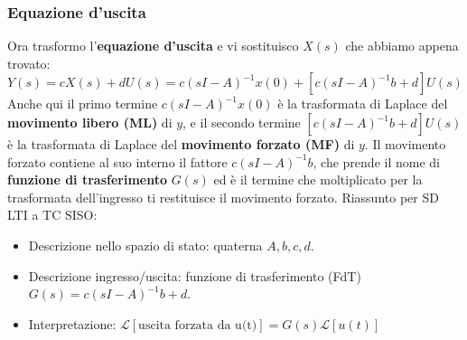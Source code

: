 \subsubsection{Equazione d'uscita}
Ora trasformo l'\textbf{equazione d'uscita} e vi sostituisco $X(s)$ che abbiamo appena trovato:
\[
    Y(s) = cX(s) + dU(s) = c(sI-A)^{-1} x(0) + [c(sI-A)^{-1} b + d]U(s)
\]
Anche qui il primo termine $c(sI-A)^{-1} x(0)$ è la trasformata di Laplace del \textbf{movimento libero (ML)} di $y$, e il secondo termine $[c(sI-A)^{-1} b + d]U(s)$ è la trasformata di Laplace del \textbf{movimento forzato (MF)} di $y$.\newline
Il movimento forzato contiene al suo interno il fattore $c(sI-A)^{-1} b$, che prende il nome di \textbf{funzione di trasferimento} $G(s)$ ed è il termine che moltiplicato per la trasformata dell'ingresso ti restituisce il movimento forzato.\newline
\newline
\newline
Riassunto per SD LTI a TC SISO:
\begin{itemize}
    \item Descrizione nello spazio di stato: quaterna $A, b, c, d$.
    \item Descrizione ingresso/uscita: funzione di trasferimento (FdT) $G(s) = c(sI-A)^{-1}b +d$.
    \item Interpretazione: $\mathcal{L}[\text{uscita forzata da u(t)}]= G(s) \mathcal{L}[u(t)]$ 
\end{itemize}
